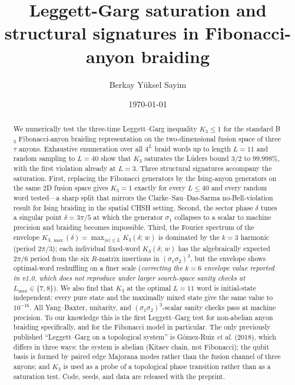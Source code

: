 \documentclass[aps,prx,reprint,amsmath,amssymb,floatfix,nofootinbib,superscriptaddress]{revtex4-2}
\begin{document}
\title{Leggett-Garg saturation and structural signatures in Fibonacci-anyon braiding}

\author{Berkay Y\"uksel Sayim}

\date{\today}

\begin{abstract}
We numerically test the three-time Leggett--Garg inequality
$K_{3} \leq 1$ for the standard B$_{3}$ Fibonacci-anyon braiding
representation on the two-dimensional fusion space of three $\tau$ anyons.
Exhaustive enumeration over all $4^{L}$ braid words up to length $L=11$
and random sampling to $L=40$ show that $K_{3}$ saturates the L\"uders
bound $3/2$ to $99.998\%$, with the first violation already at $L=3$.
Three structural signatures accompany the saturation. First, replacing
the Fibonacci generators by the Ising-anyon generators on the same
$2$D fusion space gives $K_{3}=1$ exactly for every $L \leq 40$ and every
random word tested---a sharp split that mirrors the Clarke--Sau--Das-Sarma
no-Bell-violation result for Ising braiding in the spatial CHSH setting.
Second, the sector phase $\delta$ tunes a singular point
$\delta = 3\pi/5$ at which the generator $\sigma_{1}$ collapses to a
scalar to machine precision and braiding becomes impossible.
Third, the Fourier spectrum of the envelope
$K_{3,\max}(\delta) = \max_{|w| \leq L} K_{3}(\delta;\,w)$ is
dominated by the $k=3$ harmonic (period $2\pi/3$);
each individual fixed-word $K_{3}(\delta;\,w)$ has the
algebraically expected $2\pi/6$ period from the six $R$-matrix
insertions in $(\sigma_{1}\sigma_{2})^{3}$, but the envelope shows
optimal-word reshuffling on a finer scale
(\emph{correcting the $k=6$ envelope value reported in v1.0,
which does not reproduce under larger search-space sanity checks
at $L_{\max} \in \{7, 8\}$}). We also find that $K_{3}$
at the optimal $L=11$ word is initial-state independent: every pure
state and the maximally mixed state give the same value to $10^{-16}$.
All Yang--Baxter, unitarity, and $(\sigma_{1}\sigma_{2})^{3}$-scalar
sanity checks pass at machine precision. To our knowledge this is the
first Leggett--Garg test for non-abelian anyon braiding specifically,
and for the Fibonacci model in particular. The only previously
published ``Leggett--Garg on a topological system'' is
G\'omez-Ruiz \emph{et al.} (2018), which differs in three ways: the
system is abelian (Kitaev chain, not Fibonacci); the qubit basis is
formed by paired edge Majorana modes rather than the fusion channel
of three anyons; and $K_{3}$ is used as a probe of a topological
phase transition rather than as a saturation test. Code,
seeds, and data are released with the preprint.
\end{abstract}
\end{document}
